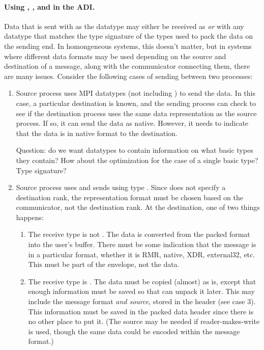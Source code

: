 \documentclass{article}
\begin{document}
\paragraph{Using , ,
   and  in the ADI.}
Data that is sent with  as the datatype may either be
received as  \emph{or} with any datatype that matches the
type signature of the types used to pack the data on the sending end.  In
homongeneous systems, this doesn't matter, but in systems where different data
formats may be used depending on the source and destination of a message,
along with the communicator connecting them, there are many issues.
Consider the following cases of sending between two processes:
\begin{enumerate}
\item Source process uses MPI datatypes (not including )
  to send the data.  In this case, a particular destination is known, and the
  sending process can check to see if the destination process uses the same
  data representation as the source process.  If so, it can send the data as
  native.  However, it needs to indicate that the data is in native format to
  the destination.

  Question: do we want datatypes to contain information on what basic types
  they contain?  How about the optimization for the case of a single basic
  type?  Type signature?

\item Source process uses  and sends using type
  .  Since  does not specify a
  destination rank, the representation format must be chosen based on the
  communicator, not the destination rank.  At the destination, one of two
  things happens:
  \begin{enumerate}
  \item The receive type is not .  The data is converted
    from the packed format into the user's buffer.  There must be some
    indication that the message is in a particular format, whether it is
    RMR, native, XDR, external32, etc.  This must be part of the
    envelope, not the data.

  \item The receive type is .  The data must be copied
    (almost) as is, except that enough information must be saved so that
     can unpack it later.  This may include the message
    format \emph{and source}, stored in the header (see case 3).  This
    information must be saved in the packed data header since there is no
    other place to put it.  (The source may be needed if
    reader-makes-write is used, though the same data could be encoded
    within the message format.)


\end{enumerate}
\end{enumerate}
\end{document}
